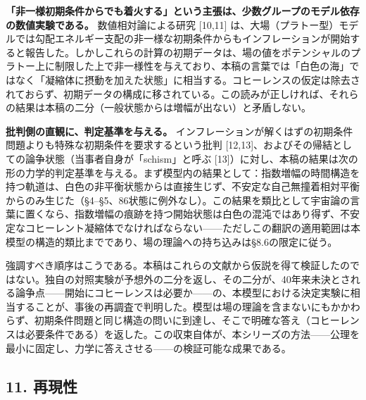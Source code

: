 \documentclass[
  a4paper,
]{ltjsarticle}
\begin{document}
\textbf{「非一様初期条件からでも着火する」という主張は、少数グループのモデル依存の数値実験である。}
数値相対論による研究 {[}10,11{]}
は、大場（プラトー型）モデルでは勾配エネルギー支配の非一様な初期条件からもインフレーションが開始すると報告した。しかしこれらの計算の初期データは、場の値をポテンシャルのプラトー上に制限した上で非一様性を与えており、本稿の言葉では「白色の海」ではなく「凝縮体に摂動を加えた状態」に相当する。コヒーレンスの仮定は除去されておらず、初期データの構成に移されている。この読みが正しければ、それらの結果は本稿の二分（一般状態からは増幅が出ない）と矛盾しない。

\textbf{批判側の直観に、判定基準を与える。}
インフレーションが解くはずの初期条件問題よりも特殊な初期条件を要求するという批判
{[}12,13{]}、およびその帰結としての論争状態（当事者自身が「schism」と呼ぶ
{[}13{]}）に対し、本稿の結果は次の形の力学的判定基準を与える。まず模型内の結果として：指数増幅の時間構造を持つ軌道は、白色の非平衡状態からは直接生じず、不安定な自己無撞着相対平衡からのみ生じた（§4--§5、86状態に例外なし）。この結果を類比として宇宙論の言葉に置くなら、指数増幅の痕跡を持つ開始状態は白色の混沌ではあり得ず、不安定なコヒーレント凝縮体でなければならない------ただしこの翻訳の適用範囲は本模型の構造的類比までであり、場の理論への持ち込みは§8.6の限定に従う。

強調すべき順序はこうである。本稿はこれらの文献から仮説を得て検証したのではない。独自の対照実験が予想外の二分を返し、その二分が、40年来未決とされる論争点------開始にコヒーレンスは必要か------の、本模型における決定実験に相当することが、事後の再調査で判明した。模型は場の理論を含まないにもかかわらず、初期条件問題と同じ構造の問いに到達し、そこで明確な答え（コヒーレンスは必要条件である）を返した。この収束自体が、本シリーズの方法------公理を最小に固定し、力学に答えさせる------の検証可能な成果である。

\subsection{11. 再現性}\label{ux518dux73feux6027}
\end{document}
